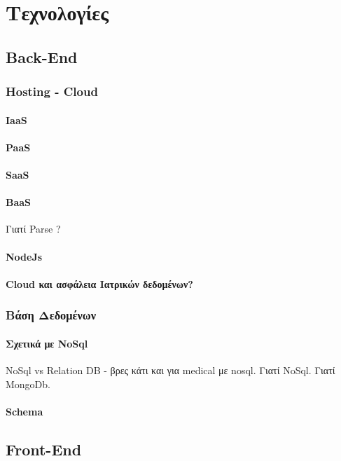 \chapter{Τεχνολογίες}\label{ch:Development Stack}
\section{Back-End}
	\subsection{Hosting - Cloud}
		\subsubsection{IaaS}
		\subsubsection{PaaS}
		\subsubsection{SaaS}
		\subsubsection{BaaS}
			Γιατί Parse ?
		\subsubsection{NodeJs}
		\subsubsection{Cloud και ασφάλεια Ιατρικών δεδομένων?}
	\subsection{Βάση Δεδομένων}
		\subsubsection{Σχετικά με NoSql}
			NoSql vs Relation DB - βρες κάτι και για medical με nosql. Γιατί NoSql. Γιατί MongoDb.
		\subsubsection{Schema}

\section{Front-End}
